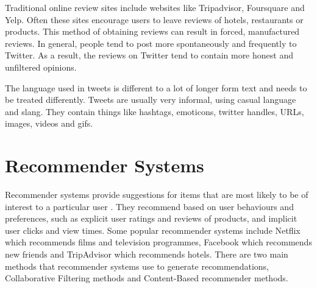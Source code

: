 Traditional online review sites include websites like Tripadvisor, Foursquare and Yelp. Often these sites encourage users to leave reviews of hotels, restaurants or products. This method of obtaining reviews can result in forced, manufactured reviews. In general, people tend to post more spontaneously and frequently to Twitter. As a result, the reviews on Twitter tend to contain more honest and unfiltered opinions. %


The language used in tweets is different to a lot of longer form text and needs to be treated differently. Tweets are usually very informal, using casual language and slang. They contain things like hashtags, emoticons, twitter handles, URLs, images, videos and gifs.

\section{Recommender Systems}
Recommender systems provide suggestions for items that are most likely to be of interest to a particular user \cite{Ricci2015}. They recommend based on user behaviours and preferences, such as explicit user ratings and reviews of products, and implicit user clicks and view times. Some popular recommender systems include Netflix which recommends films and television programmes, Facebook which recommends new friends and TripAdvisor which recommends hotels. There are two main methods that recommender systems use to generate recommendations, Collaborative Filtering methods and Content-Based recommender methods. 

